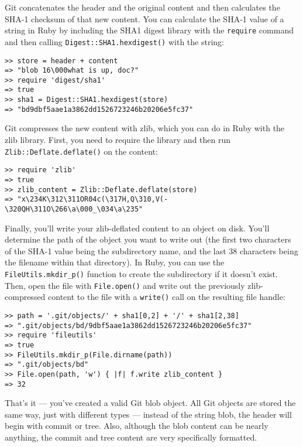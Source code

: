 \documentclass[a4paper]{book}
\begin{document}
Git concatenates the header and the original content and then calculates the SHA-1 checksum of that new content. You can calculate the SHA-1 value of a string in Ruby by including the SHA1 digest library with the \texttt{require} command and then calling \texttt{Digest::SHA1.hexdigest()} with the string:

\begin{shaded}\begin{verbatim}
>> store = header + content
=> "blob 16\000what is up, doc?"
>> require 'digest/sha1'
=> true
>> sha1 = Digest::SHA1.hexdigest(store)
=> "bd9dbf5aae1a3862dd1526723246b20206e5fc37"
\end{verbatim}\end{shaded}

Git compresses the new content with zlib, which you can do in Ruby with the zlib library. First, you need to require the library and then run \texttt{Zlib::Deflate.deflate()} on the content:

\begin{shaded}\begin{verbatim}
>> require 'zlib'
=> true
>> zlib_content = Zlib::Deflate.deflate(store)
=> "x\234K\312\311OR04c(\317H,Q\310,V(-\320QH\311O\266\a\000_\034\a\235"
\end{verbatim}\end{shaded}

Finally, you'll write your zlib-deflated content to an object on disk. You'll determine the path of the object you want to write out (the first two characters of the SHA-1 value being the subdirectory name, and the last 38 characters being the filename within that directory). In Ruby, you can use the \texttt{FileUtils.mkdir\_p()} function to create the subdirectory if it doesn't exist. Then, open the file with \texttt{File.open()} and write out the previously zlib-compressed content to the file with a \texttt{write()} call on the resulting file handle:

\begin{shaded}\begin{verbatim}
>> path = '.git/objects/' + sha1[0,2] + '/' + sha1[2,38]
=> ".git/objects/bd/9dbf5aae1a3862dd1526723246b20206e5fc37"
>> require 'fileutils'
=> true
>> FileUtils.mkdir_p(File.dirname(path))
=> ".git/objects/bd"
>> File.open(path, 'w') { |f| f.write zlib_content }
=> 32
\end{verbatim}\end{shaded}

That's it --- you've created a valid Git blob object. All Git objects are stored the same way, just with different types --- instead of the string blob, the header will begin with commit or tree. Also, although the blob content can be nearly anything, the commit and tree content are very specifically formatted.
\end{document}
